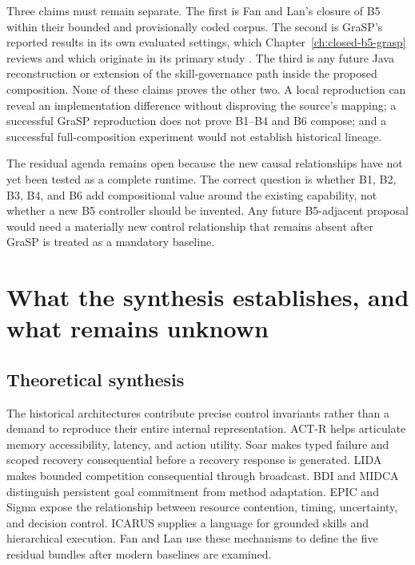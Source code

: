 Three claims must remain separate. The first is Fan and Lan's closure of B5 within their bounded and provisionally coded corpus. The second is GraSP's reported results in its own evaluated settings, which Chapter~\ref{ch:closed-b5-grasp} reviews and which originate in its primary study \cite{xia2026grasp}. The third is any future Java reconstruction or extension of the skill-governance path inside the proposed composition. None of these claims proves the other two. A local reproduction can reveal an implementation difference without disproving the source's mapping; a successful GraSP reproduction does not prove B1--B4 and B6 compose; and a successful full-composition experiment would not establish historical lineage.

The residual agenda remains open because the new causal relationships have not yet been tested as a complete runtime. The correct question is whether B1, B2, B3, B4, and B6 add compositional value around the existing capability, not whether a new B5 controller should be invented. Any future B5-adjacent proposal would need a materially new control relationship that remains absent after GraSP is treated as a mandatory baseline.

\section{What the synthesis establishes, and what remains unknown}

\subsection{Theoretical synthesis}
\label{subsec:ch18-theoretical-synthesis}

The historical architectures contribute precise control invariants rather than a demand to reproduce their entire internal representation. ACT-R helps articulate memory accessibility, latency, and action utility. Soar makes typed failure and scoped recovery consequential before a recovery response is generated. LIDA makes bounded competition consequential through broadcast. BDI and MIDCA distinguish persistent goal commitment from method adaptation. EPIC and Sigma expose the relationship between resource contention, timing, uncertainty, and decision control. ICARUS supplies a language for grounded skills and hierarchical execution. Fan and Lan use these mechanisms to define the five residual bundles after modern baselines are examined.

